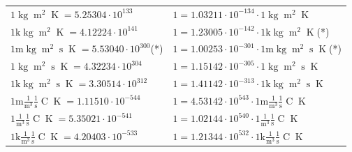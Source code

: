 \begin{center}
\begin{longtable}{l l}
{\color{black}$1 \bm{\mathrm{ }}\operatorname{kg}{\operatorname{m}^2}{}{}{\operatorname{K}} = 5.25304\cdot10^{133} $}   & {\color{black}$ 1 = 1.03211\cdot10^{-134} \cdot 1 \bm{\mathrm{ }}\operatorname{kg}{\operatorname{m}^2}{}{}{\operatorname{K}}$}  \\
{\color{gray}$1 \bm{\mathrm{ k}}\operatorname{kg}{\operatorname{m}^2}{}{}{\operatorname{K}} = 4.12224\cdot10^{141} $}   & {\color{gray}$ 1 = 1.23005\cdot10^{-142} \cdot 1 \bm{\mathrm{ k}}\operatorname{kg}{\operatorname{m}^2}{}{}{\operatorname{K}}$}\quad(*)\\
{\color{gray}$1 \bm{\mathrm{ m}}\operatorname{kg}{\operatorname{m}^2}{\operatorname{s}}{}{\operatorname{K}} = 5.53040\cdot10^{300} $}\quad(*) & {\color{gray}$ 1 = 1.00253\cdot10^{-301} \cdot 1 \bm{\mathrm{ m}}\operatorname{kg}{\operatorname{m}^2}{\operatorname{s}}{}{\operatorname{K}}$}\quad(*)\\
{\color{black}$1 \bm{\mathrm{ }}\operatorname{kg}{\operatorname{m}^2}{\operatorname{s}}{}{\operatorname{K}} = 4.32234\cdot10^{304} $}   & {\color{black}$ 1 = 1.15142\cdot10^{-305} \cdot 1 \bm{\mathrm{ }}\operatorname{kg}{\operatorname{m}^2}{\operatorname{s}}{}{\operatorname{K}}$}  \\
{\color{gray}$1 \bm{\mathrm{ k}}\operatorname{kg}{\operatorname{m}^2}{\operatorname{s}}{}{\operatorname{K}} = 3.30514\cdot10^{312} $}   & {\color{gray}$ 1 = 1.41142\cdot10^{-313} \cdot 1 \bm{\mathrm{ k}}\operatorname{kg}{\operatorname{m}^2}{\operatorname{s}}{}{\operatorname{K}}$}  \\
\hline{\color{gray}$1 \bm{\mathrm{ m}}\frac1{\operatorname{m}^3}\frac1{\operatorname{s}}{\operatorname{C}}{\operatorname{K}} = 1.11510\cdot10^{-544} $}   & {\color{gray}$ 1 = 4.53142\cdot10^{543} \cdot 1 \bm{\mathrm{ m}}\frac1{\operatorname{m}^3}\frac1{\operatorname{s}}{\operatorname{C}}{\operatorname{K}}$}  \\
{\color{black}$1 \bm{\mathrm{ }}\frac1{\operatorname{m}^3}\frac1{\operatorname{s}}{\operatorname{C}}{\operatorname{K}} = 5.35021\cdot10^{-541} $}   & {\color{black}$ 1 = 1.02144\cdot10^{540} \cdot 1 \bm{\mathrm{ }}\frac1{\operatorname{m}^3}\frac1{\operatorname{s}}{\operatorname{C}}{\operatorname{K}}$}  \\
{\color{gray}$1 \bm{\mathrm{ k}}\frac1{\operatorname{m}^3}\frac1{\operatorname{s}}{\operatorname{C}}{\operatorname{K}} = 4.20403\cdot10^{-533} $}   & {\color{gray}$ 1 = 1.21344\cdot10^{532} \cdot 1 \bm{\mathrm{ k}}\frac1{\operatorname{m}^3}\frac1{\operatorname{s}}{\operatorname{C}}{\operatorname{K}}$}  \\

\end{longtable}
\end{center}

